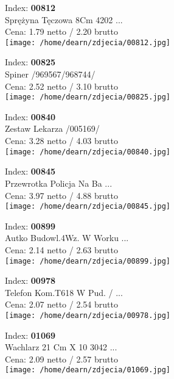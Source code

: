 {Index: \textbf{00812}\\
Sprężyna Tęczowa 8Cm 4202 ...\\
Cena: 1.79 netto / 2.20 brutto\\
  \texttt{[image: /home/dearn/zdjecia/00812.jpg]}}\newline\newline

{Index: \textbf{00825}\\
Spiner /969567/968744/\\
Cena: 2.52 netto / 3.10 brutto\\
  \texttt{[image: /home/dearn/zdjecia/00825.jpg]}}\newline\newline

{Index: \textbf{00840}\\
Zestaw Lekarza /005169/\\
Cena: 3.28 netto / 4.03 brutto\\
  \texttt{[image: /home/dearn/zdjecia/00840.jpg]}}\newline\newline

{Index: \textbf{00845}\\
Przewrotka  Policja Na Ba ...\\
Cena: 3.97 netto / 4.88 brutto\\
  \texttt{[image: /home/dearn/zdjecia/00845.jpg]}}\newline\newline

{Index: \textbf{00899}\\
Autko Budowl.4Wz. W Worku ...\\
Cena: 2.14 netto / 2.63 brutto\\
  \texttt{[image: /home/dearn/zdjecia/00899.jpg]}}\newline\newline

{Index: \textbf{00978}\\
Telefon Kom.T618 W Pud. / ...\\
Cena: 2.07 netto / 2.54 brutto\\
  \texttt{[image: /home/dearn/zdjecia/00978.jpg]}}\newline\newline

{Index: \textbf{01069}\\
Wachlarz 21 Cm X 10  3042 ...\\
Cena: 2.09 netto / 2.57 brutto\\
  \texttt{[image: /home/dearn/zdjecia/01069.jpg]}}\newline\newline

